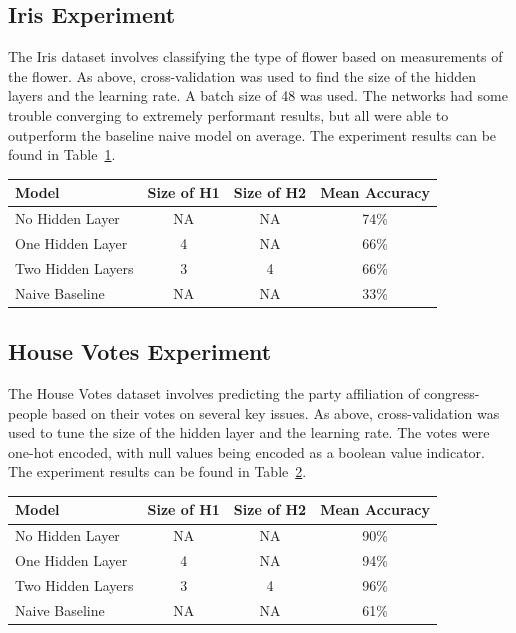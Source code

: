 \documentclass{amsart}
\begin{document}
    \subsection*{Iris Experiment}
    The Iris dataset\cite{irisdataset} involves classifying the type of flower based on measurements
    of the flower. As above, cross-validation was used to find the size of the hidden layers and the learning
    rate. A batch size of 48 was used. The networks had some trouble converging to extremely
    performant results, but all were able to outperform the baseline naive model on average.
    The experiment results can be found in Table~\ref{iris_results}.
    \begin{table}[H]
    \begin{tabular}{lccc}
    Model & Size of H1 & Size of H2 & Mean Accuracy \\
    \hline
    No Hidden Layer & NA & NA & 74\% \\
    One Hidden Layer & 4 & NA & 66\% \\
    Two Hidden Layers & 3 & 4 & 66\% \\
    Naive Baseline & NA & NA & 33\%
    \end{tabular}
    \label{iris_results}
    \end{table}

    \subsection*{House Votes Experiment}
    The House Votes dataset\cite{housedataset}
    involves predicting the party
    affiliation of congress-people based on their votes on several key
    issues. As above, cross-validation was used to tune the size of the
    hidden layer and the learning rate. The votes were
    one-hot encoded, with null values being encoded as a boolean
    value indicator.
    The experiment results can be found in Table~\ref{house_results}.
    \begin{table}[H]
    \begin{tabular}{lccc}
    Model & Size of H1 & Size of H2 & Mean Accuracy \\
    \hline
    No Hidden Layer & NA & NA & 90\% \\
    One Hidden Layer & 4 & NA & 94\% \\
    Two Hidden Layers & 3 & 4 & 96\% \\
    Naive Baseline & NA & NA & 61\%
    \end{tabular}
    \label{house_results}
    \end{table}




\end{document}

